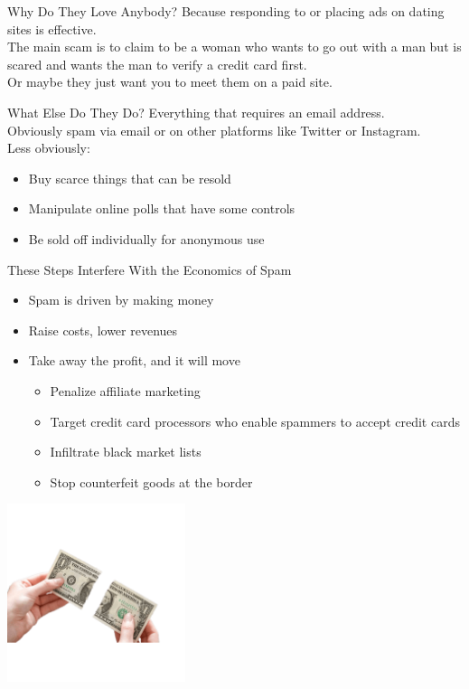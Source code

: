 \documentclass[nobackground,dvipsnames,table]{beamer}
\begin{document}
\begin{frame}{Why Do They Love Anybody?}
    Because responding to or placing ads on dating sites is effective.\\
    The main scam is to claim to be a woman who wants to go out with a man but is scared and wants the man to verify a credit card first.\\
    Or maybe they just want you to meet them on a paid site.
\end{frame}

\begin{frame}{What Else Do They Do?}
    Everything that requires an email address.\\
    Obviously spam via email or on other platforms like Twitter or Instagram.\\
    Less obviously:
    \begin{itemize}
        \item Buy scarce things that can be resold
        \item Manipulate online polls that have some controls
        \item Be sold off individually for anonymous use
    \end{itemize}
\end{frame}

\begin{frame}{These Steps Interfere With the Economics of Spam} %
    \begin{itemize}
        \item Spam is driven by making money
        \item Raise costs, lower revenues
        \item Take away the profit, and it will move
        \begin{itemize}
            \item Penalize affiliate marketing
            \item Target credit card processors who enable spammers to accept credit cards
            \item Infiltrate black market lists
            \item Stop counterfeit goods at the border
        \end{itemize}
    \end{itemize}
    \includegraphics[width=0.39\textwidth, left]{torn-dollar}
\end{frame}
\end{document}
